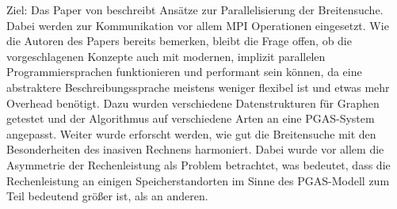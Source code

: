 Ziel:
Das Paper von \cite{Buluc:2011} beschreibt Ansätze zur Parallelisierung der Breitensuche. Dabei werden zur Kommunikation vor allem MPI Operationen eingesetzt. Wie die Autoren des Papers bereits bemerken, bleibt die Frage offen, ob die vorgeschlagenen Konzepte auch mit modernen, implizit parallelen Programmiersprachen funktionieren und performant sein können, da eine abstraktere Beschreibungssprache meistens weniger flexibel ist und etwas mehr Overhead benötigt. Dazu wurden verschiedene Datenstrukturen für Graphen getestet und der Algorithmus auf verschiedene Arten an eine PGAS-System angepasst. Weiter wurde erforscht werden, wie gut die Breitensuche mit den Besonderheiten des inasiven Rechnens harmoniert. Dabei wurde vor allem die Asymmetrie der Rechenleistung als Problem betrachtet, was bedeutet, dass die Rechenleistung an einigen Speicherstandorten im Sinne des PGAS-Modell zum Teil bedeutend größer ist, als an anderen.


